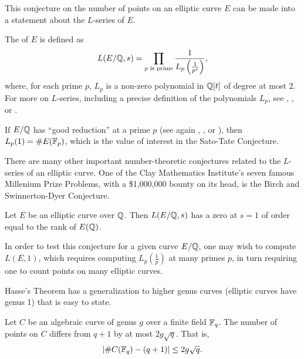 This conjecture on the number of points on an elliptic curve $E$
can be made into a statement about the $L$-series of $E$.
\begin{comment}
The $L$-series of curves are central to many conjectures in number theory.
A complete discussion of $L$-series is outside the scope of this thesis;
we present only enough to motivate the topic of this thesis.
Let $E$ be an elliptic curve defined over the rational numbers $\bb Q$,
meaning $E$ is defined by a polynomial in $\bb Q[x,y]$ of the form of Equation \ref{eq_elliptic}.
\end{comment}
The  of $E$ is defined as
\[ L(E/\mathbb{Q}, s)  = \prod_{p \text{ is prime}} \frac 1 {L_p \left( \frac 1 {p^s} \right)},\]
where, for each prime $p$, $L_p$ is a non-zero polynomial in $\mathbb{Q}[t]$ of degree at most 2.
For more on $L$-series, including a precise definition of the polynomials $L_p$,
see \cite{husemoller87}, \cite{milne06}, or \cite{silverman09}.

If $E/\mathbb{Q}$ has ``good reduction'' at a prime $p$
(see again \cite{husemoller87}, \cite{milne06}, or \cite{silverman09}),
then $L_p(1) = \#E(\mathbb{F}_p)$, which is the value of interest in the Sato-Tate Conjecture.

There are many other important number-theoretic conjectures related to the $L$-series of an elliptic curve.
One of the Clay Mathematics Institute's seven famous Millenium Prize Problems,
with a \$1,000,000 bounty on its head,
is the Birch and Swinnerton-Dyer Conjecture.

\begin{conjecture}
  Let $E$ be an elliptic curve over $\mathbb{Q}$.
  Then $L(E/\mathbb{Q}, s)$ has a zero at $s = 1$ of order equal to the rank of $E(\mathbb{Q})$.
\end{conjecture}

In order to test this conjecture for a given curve $E/\mathbb{Q}$,
one may wish to compute $L(E, 1)$, which requires computing $L_p(\frac 1 p)$ at many primes $p$,
in turn requiring one to count points on many elliptic curves.

Hasse's Theorem has a generalization to higher genus curves
(elliptic curves have genus 1) that is easy to state.
\begin{theorem}
  \label{thm_hasse_weil}
  Let $C$ be an algebraic curve of genus $g$ over a finite field $\mathbb{F}_q$.
  The number of points on $C$ differs from $q + 1$ by at most $2g \sqrt q$.
  That is,
  \[ | \#C(\mathbb{F}_q) - (q + 1) | \leq 2g \sqrt q. \]
\end{theorem}

